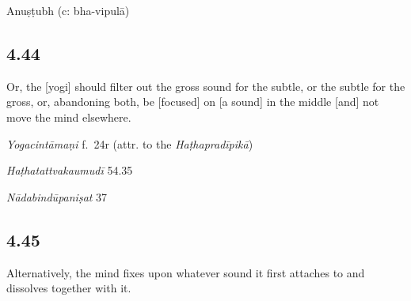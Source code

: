 \begin{ekdosis}

\begin{metre}[hp04_043]
Anuṣṭubh (c: bha-vipulā)
\end{metre}

\subsection*{4.44}
\begin{translation}[hp04_044]
Or, the [yogi] should filter out the gross sound for the subtle, or the subtle for the gross, or, abandoning both, be [focused] on [a sound] in the middle [and] not move the mind elsewhere.%
\end{translation} %

\begin{testimonia}[hp04_044]
\emph{Yogacintāmaṇi} f.~24r (attr. to the \emph{Haṭhapradīpikā})
\begin{versinnote}
\end{versinnote}

\emph{Haṭhatattvakaumudī} 54.35
\begin{versinnote}
\end{versinnote}

\emph{Nādabindūpaniṣat} 37
\begin{versinnote}
\end{versinnote}
\end{testimonia}


\subsection*{4.45}
\begin{translation}[hp04_045]
Alternatively, the mind fixes upon whatever sound it first attaches to and dissolves together with it.
\end{translation}


\end{ekdosis}
